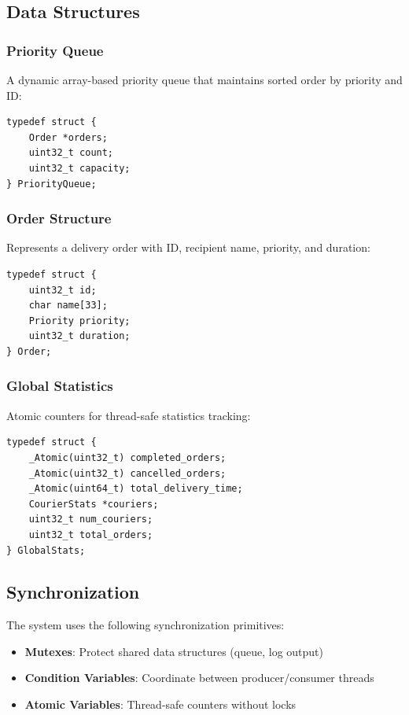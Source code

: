 \documentclass[12pt,a4paper]{article}
\begin{document}
\subsection{Data Structures}

\subsubsection{Priority Queue}
A dynamic array-based priority queue that maintains sorted order by priority and ID:

\begin{lstlisting}
typedef struct {
    Order *orders;
    uint32_t count;
    uint32_t capacity;
} PriorityQueue;
\end{lstlisting}

\subsubsection{Order Structure}
Represents a delivery order with ID, recipient name, priority, and duration:

\begin{lstlisting}
typedef struct {
    uint32_t id;
    char name[33];
    Priority priority;
    uint32_t duration;
} Order;
\end{lstlisting}

\subsubsection{Global Statistics}
Atomic counters for thread-safe statistics tracking:

\begin{lstlisting}
typedef struct {
    _Atomic(uint32_t) completed_orders;
    _Atomic(uint32_t) cancelled_orders;
    _Atomic(uint64_t) total_delivery_time;
    CourierStats *couriers;
    uint32_t num_couriers;
    uint32_t total_orders;
} GlobalStats;
\end{lstlisting}

\subsection{Synchronization}

The system uses the following synchronization primitives:

\begin{itemize}
    \item \textbf{Mutexes}: Protect shared data structures (queue, log output)
    \item \textbf{Condition Variables}: Coordinate between producer/consumer threads
    \item \textbf{Atomic Variables}: Thread-safe counters without locks
\end{itemize}
\end{document}
